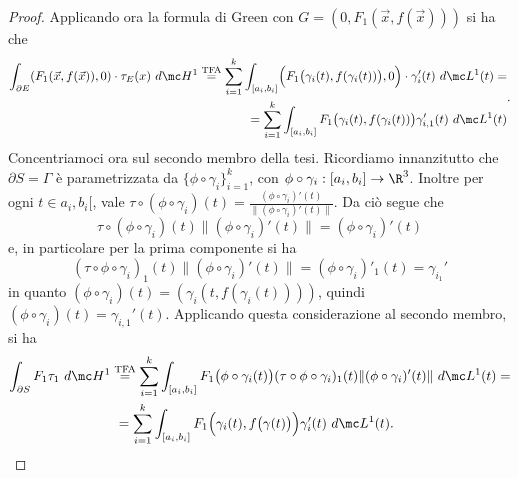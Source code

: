 \begin{proof}
    Applicando ora la formula di Green con $G=(0,F_1(\vec x, f(\vec x)))$ si ha che
    \[\begin{split}\int_{\partial E}(F_1(\vec x, f(\vec x)),0)\cdot \tau _E(x)\ d\mc H^1 \overset{\text{TFA}}= \sum_{i=1}^k\int_{[a_i,b_i]}\Bigl(F_1\bigl(\gamma_i(t), f(\gamma_i(t))\bigr),0\Bigr)\cdot \gamma_i'(t)\ d\mc L^1(t) = \\ = \sum_{i=1}^k\int_{[a_i,b_i]}F_1\bigl(\gamma_i(t), f(\gamma_i(t))\bigr) \gamma_{i,1}'(t)\ d\mc L^1(t)\end{split}.\]
    Concentriamoci ora sul secondo membro della tesi. Ricordiamo innanzitutto che $\partial S = \Gamma$ è parametrizzata da $\{\phi\circ \gamma_i\}_{i=1}^k$, con $\phi\circ \gamma_i: [a_i,b_i]\to \R^3$. Inoltre per ogni $t\in a_i,b_i[$, vale $\tau\circ(\phi\circ \gamma_i)(t) = \frac{(\phi\circ \gamma_i)'(t)}{\|(\phi\circ \gamma_i)'(t)\|}$. Da ciò segue che 
    \[\tau\circ(\phi\circ \gamma_i)(t) \|(\phi\circ \gamma_i)'(t)\|= (\phi\circ \gamma_i)'(t)\]
    e, in particolare per la prima componente si ha
    \[(\tau\circ\phi\circ \gamma_i)_1(t) \|(\phi\circ \gamma_i)'(t)\|= (\phi\circ \gamma_i)'_1(t)= \gamma_{i_1}'\]
    in quanto $(\phi\circ \gamma_i)(t)= (\gamma_i(t,f(\gamma_i(t))))$, quindi $(\phi\circ \gamma_i)(t) = \gamma_{i,1}'(t)$. Applicando questa considerazione al secondo membro, si ha 
    \[\begin{aligned}
        \int_{\partial S}F_1\tau_1\ d\mc H^1 &\overset{\text{TFA}}{=} \sum_{i=1}^{k}\int_{[a_i,b_i]}F_1\bigl(\phi\circ \gamma_i(t)\bigr)(\tau\circ\phi\circ \gamma_i)_1(t) \|(\phi\circ \gamma_i)'(t)\|\ d\mc L^1(t) = \\ & \ = \sum_{i=1}^{k}\int_{[a_i,b_i]}F_1\Bigl(\gamma_i(t), f\bigl(\gamma(t)\bigr)\Bigr)\gamma_i'(t)\ d\mc L^1(t).\qedhere
    \end{aligned}\]
\end{proof}